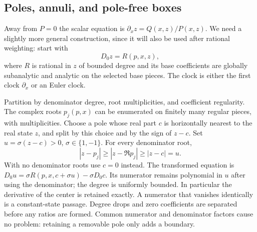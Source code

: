 \subsection{Poles, annuli, and pole-free boxes}

Away from $P=0$ the scalar equation is $\partial_x z=Q(x,z)/P(x,z)$.
We need a slightly more general construction, since it will also be
used after rational weighting: start with
\begin{equation}
\label{eq:subdivision-rational}
 D_0z=R(p,x,z),
\end{equation}
where $R$ is rational in $z$ of bounded degree and its base coefficients
are globally subanalytic and analytic on the selected base pieces.
The clock is either the first clock $\partial_x$ or an Euler clock.

Partition by denominator degree, root multiplicities, and coefficient
regularity.  The complex roots $p_j(p,x)$ can be enumerated on finitely
many regular pieces, with multiplicities.  Choose a pole whose real part
$c$ is horizontally nearest to the real state $z$, and split by this
choice and by the sign of $z-c$.  Set $u=\sigma(z-c)>0$,
$\sigma\in\{1,-1\}$.  For every denominator root,
\begin{equation}
\label{eq:subdivision-pole-distance}
 |z-p_j|\ge |z-\Re p_j|\ge |z-c|=u.
\end{equation}
With no denominator roots use $c=0$ instead.  The transformed equation is
$D_0u=\sigma R(p,x,c+\sigma u)-\sigma D_0c$.
Its numerator remains polynomial in $u$ after using the denominator;
the degree is uniformly bounded.  In particular the derivative of the
center is retained exactly.  A numerator that vanishes identically is a
constant-state passage.  Degree drops and zero coefficients are separated
before any ratios are formed.  Common numerator and denominator factors
cause no problem: retaining a removable pole only adds a boundary.


